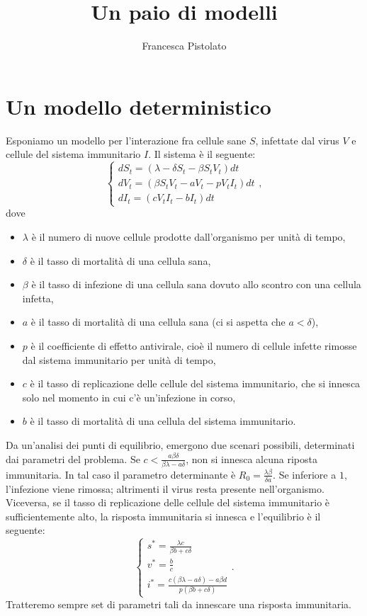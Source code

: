 \documentclass[12pt,a4paper,oneside]{amsart}
\author{Francesca Pistolato}
\title{Un paio di modelli}
\theoremstyle{definition}
\begin{document}
\maketitle

\section{Un modello deterministico}
Esponiamo un modello per l'interazione fra cellule sane $S$, infettate dal virus $V$ e cellule del sistema immunitario $I$. Il sistema è il seguente:
$$\begin{cases}
dS_t=\left(\lambda-\delta S_t-\beta S_tV_t\right)dt\\
dV_t=\left(\beta S_tV_t-a V_t -pV_tI_t\right)dt\\
dI_t=\left(cV_tI_t-bI_t\right)dt
\end{cases},$$
dove \begin{itemize}
\item $\lambda$ è il numero di nuove cellule prodotte dall'organismo per unità di tempo,
\item $\delta$ è il tasso di mortalità di una cellula sana,
\item $\beta$ è il tasso di infezione di una cellula sana dovuto allo scontro con una cellula infetta,
\item $a$ è il tasso di mortalità di una cellula sana (ci si aspetta che $a<\delta$),
\item $p$ è il coefficiente di effetto antivirale, cioè il numero di cellule infette rimosse dal sistema immunitario per unità di tempo,
\item $c$ è il tasso di replicazione delle cellule del sistema immunitario, che si innesca solo nel momento in cui c'è un'infezione in corso,
\item $b$ è il tasso di mortalità di una cellula del sistema immunitario.
\end{itemize}

Da un'analisi dei punti di equilibrio, emergono due scenari possibili, determinati dai parametri del problema. Se $c<\frac{a\beta \delta}{\beta\lambda-a\delta}$, non si innesca alcuna riposta immunitaria. In tal caso il parametro determinante è $R_0=\frac{\lambda\beta}{\delta a}$. Se inferiore a $1$, l'infezione viene rimossa; altrimenti il virus resta presente nell'organismo. Viceversa, se il tasso di replicazione delle cellule del sistema immunitario è sufficientemente alto, la risposta immunitaria si innesca e l'equilibrio è il seguente: $$\begin{cases}
s^*=\frac{\lambda c}{\beta b+c\delta}\\
v^*=\frac{b}{c}\\
i^*=\frac{c(\beta\lambda-a\delta)-a\beta d}{p(\beta b+c\delta)}
\end{cases}.$$
Tratteremo sempre set di parametri tali da innescare una risposta immunitaria.
\end{document}
